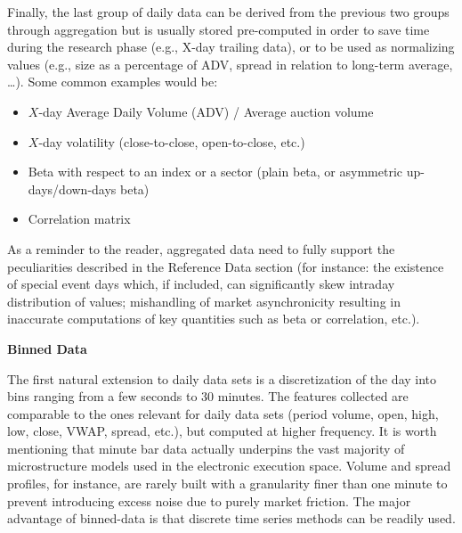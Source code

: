 Finally, the last group of daily data can be derived from the previous two groups through aggregation but is usually stored pre-computed in order to save time during the research phase (e.g., X-day trailing data), or to be used as normalizing values (e.g., size as a percentage of ADV, spread in relation to long-term average, \dots). Some common examples would be:
        \begin{itemize}
        \item $X$-day Average Daily Volume (ADV) / Average auction volume
        \item $X$-day volatility (close-to-close, open-to-close, etc.)
        \item Beta with respect to an index or a sector (plain beta, or asymmetric up-days/down-days beta)
        \item Correlation matrix
        \end{itemize}


As a reminder to the reader, aggregated data need to fully support the peculiarities described in the Reference Data section (for instance: the existence of special event days which, if included, can significantly skew intraday distribution of values; mishandling of market asynchronicity resulting in inaccurate computations of key quantities such as beta or correlation, etc.).\twomedskip


\noindent\textbf{Binned Data}\label{in:binned_data}\twomedskip

The first natural extension to daily data sets is a discretization of the day into bins ranging from a few seconds to 30 minutes. The features collected are comparable to the ones relevant for daily data sets (period volume, open, high, low, close, VWAP, spread, etc.), but computed at higher frequency. It is worth mentioning that minute bar data actually underpins the vast majority of microstructure models used in the electronic execution space. Volume and spread profiles, for instance, are rarely built with a granularity finer than one minute to prevent introducing excess noise due to purely market friction. The major advantage of binned-data is that discrete time series methods can be readily used.


